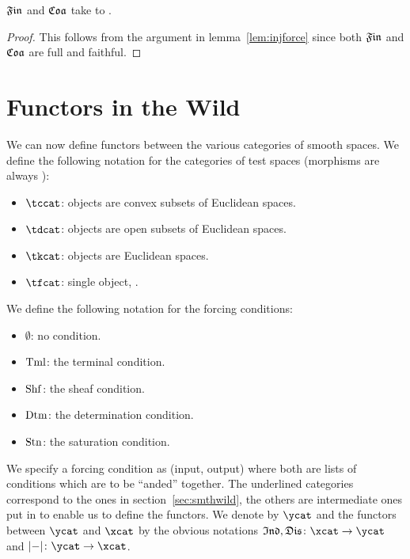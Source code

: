\documentclass[%
12pt,%
arxiv,%
defaults
]{myclass}
\begin{document}
\begin{proposition}
\(\finfunc\) and \(\coafunc\) take \BuFVtobjs to \AuFVtobjs.
\end{proposition}

\begin{proof}
This follows from the argument in lemma~\ref{lem:injforce} since both \(\finfunc\) and \(\coafunc\) are full and faithful.
\end{proof}


\section{Functors in the Wild}
\label{sec:funwild}

We can now define functors between the various categories of smooth spaces.
We define the following notation for the categories of test spaces (morphisms are always \cimaps):
%
\begin{itemize}
\item \(\tccat\): objects are convex subsets of Euclidean spaces.
\item \(\tdcat\): objects are open subsets of Euclidean spaces.
\item \(\tkcat\): objects are Euclidean spaces.
\item \(\tfcat\): single object, \R.
\end{itemize}

We define the following notation for the forcing conditions:
%
\begin{itemize}
\item \(\emptyset\): no condition.
\item \(\operatorname{Tml}\): the terminal condition.
\item \(\operatorname{Shf}\): the sheaf condition.
\item \(\operatorname{Dtm}\): the determination condition.
\item \(\operatorname{Stn}\): the saturation condition.
\end{itemize}
%
We specify a forcing condition as (input, output) where both are lists of conditions which are to be ``anded'' together.
The underlined categories correspond to the ones in section~\ref{sec:smthwild}, the others are intermediate ones put in to enable us to define the functors.
We denote \ycat by \(\ycat\) and the functors between \(\ycat\) and \(\xcat\) by the obvious notations \(\indfunc, \disfunc \colon \xcat \to \ycat\) and \(\forfunc \colon \ycat \to \xcat\).
\end{document}
